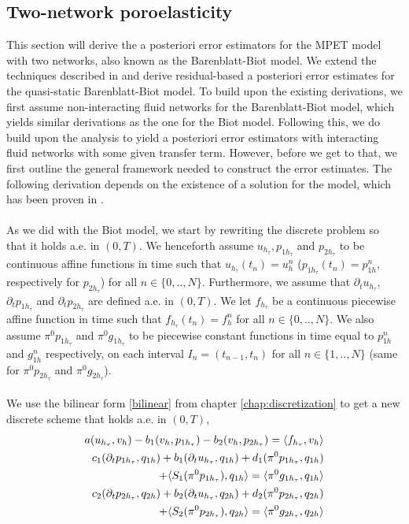 \subsection{Two-network poroelasticity} \label{section:error_bb}
This section will derive the a posteriori error estimators for the MPET model with two networks, also known as the Barenblatt-Biot model. We extend the techniques described in \cite{meunier} and derive residual-based a posteriori error estimates for the quasi-static Barenblatt-Biot model. To build upon the existing derivations, we first assume non-interacting fluid networks for the Barenblatt-Biot model, which yields similar derivations as the one for the Biot model. Following this, we do build upon the analysis to yield a posteriori error estimators with interacting fluid networks with some given transfer term. However, before we get to that, we first outline the general framework needed to construct the error estimates. The following derivation depends on the existence of a solution for the model, which has been proven in \cite{nordbotten}. 
\\
\\
As we did with the Biot model, we start by rewriting the discrete problem so 
that it holds a.e. in $(0,T)$. We henceforth assume $u_{h_\tau}, p_{1h_\tau}$ and $p_{2h_\tau}$ to be continuous affine functions in time such that $u_{h_\tau}(t_n) = u_h^n$ ($p_{1h_\tau}(t_n) = p^n_{1h}$, respectively for $p_{2h_\tau}$) for all $n \in \{0,..,N\}$. Furthermore, we assume that $\partial_t u_{h_\tau}$, $\partial_t p_{1h_\tau}$ and $\partial_t p_{2h_\tau}$ are defined a.e. in $(0,T)$. We let $f_{h_\tau}$ be a continuous piecewise affine function in time such that $f_{h_\tau}(t_n) = f_h^n$ for all $n \in \{0,..,N\}$. We also assume $\pi^0p_{1h_\tau}$ and $\pi^0g_{1h_\tau}$ to be piecewise constant functions in time equal to $p_{1h}^n$ and $g_{1h}^n$ respectively, on each interval $I_n = (t_{n-1}, t_n)$ for all $n \in \{1,..,N\}$ (same for $\pi^0p_{2h_\tau}$ and $\pi^0g_{2h_\tau}$). 
\\ 
\\
We use the bilinear form \ref{bilinear} from chapter \ref{chap:discretization} to get a new discrete scheme that holds a.e. in $(0,T)$, 
\begin{align} \label{bb:bilinear_1}
a(u_{h_\tau}, v_h)-b_1(v_h, p_{1h_\tau}) - b_2(v_h, p_{2h_\tau}) = \langle f_{h_\tau}, v_h \rangle \\
c_1(\partial_t p_{1h_\tau}, q_{1h}) + b_1(\partial_t u_{h_\tau}, q_{1h}) + d_1(\pi^0p_{1h_\tau}, q_{1h}) \\+ \langle S_1(\pi^0p_{1h_\tau}), q_{1h}\rangle = \langle \pi^0g_{1h_\tau}, q_{1h} \rangle  \notag\\
c_2(\partial_t p_{2h_\tau}, q_{2h}) + b_2(\partial_t u_{h_\tau}, q_{2h}) 
+ d_2(\pi^0p_{2h_\tau}, q_{2h}) \label{bb:bilinear_2} \\
+ \langle S_2(\pi^0p_{2h_\tau}), q_{2h}\rangle = \langle \pi^0g_{2h_\tau}, q_{2h} \rangle \label{bb:bilinear_2} \notag
\end{align}
